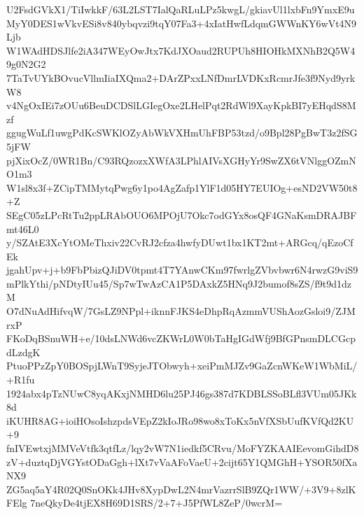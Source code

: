 U2FsdGVkX1/TiIwkkF/63L2LST7IalQaRLuLPz5kwgL/gkiavUl1lxbFn9YmxE9u
MyY0DES1wVkvESi8v840ybqvzi9tqY07Fa3+4xIatHwfLdqmGWWnKY6wVt4N9Ljb
W1WAdHDSJlfe2iA347WEyOwJtx7KdJXOaud2RUPUh8HIOHkMXNhB2Q5W49g0N2G2
7TaTvUYkBOvucVllmIiaIXQma2+DArZPxxLNfDmrLVDKxRcmrJfe3f9Nyd9yrkW8
v4NgOxIEi7zOUu6BeuDCDSlLGIegOxe2LHelPqt2RdWl9XayKpkBI7yEHqdS8Mzf
ggugWuLf1uwgPdKcSWKlOZyAbWkVXHmUhFBP53tzd/o9Bpl28PgBwT3z2fSG5jFW
pjXixOcZ/0WR1Bn/C93RQzozxXWfA3LPhlAIVsXGHyYr9SwZX6tVNlggOZmNO1m3
W1sl8x3f+ZCipTMMytqPwg6y1po4AgZafp1YlF1d05HY7EUIOg+esND2VW50t8+Z
SEgC05zLPcRtTu2ppLRAbOUO6MPOjU7Okc7odGYx8osQF4GNaKsmDRAJBFmt46L0
y/SZAtE3XcYtOMeThxiv22CvRJ2cfza4hwfyDUwt1bx1KT2mt+ARGcq/qEzoCfEk
jgahUpv+j+b9FbPbizQJiDV0tpmt4T7YAnwCKm97fwrlgZVbvbwr6N4rwzG9viS9
mPlkYthi/pNDtyIUu45/Sp7wTwAzCA1P5DAxkZ5HNq9J2bumof8sZS/f9t9d1dzM
O7dNuAdHifvqW/7GsLZ9NPpl+iknnFJKS4eDhpRqAzmmVUShAozGsloi9/ZJMrxP
FKoDqBSnuWH+e/10dsLNWd6vcZKWrL0W0bTaHgIGdWfj9BfGPnsmDLCGcpdLzdgK
PtuoPPzZpY0BOSpjLWnT9SyjeJTObwyh+xeiPmMJZv9GaZcnWKeW1WbMiL/+R1fu
1924abx4pTzNUwC8yqAKxjNMHD6lu25PJ46gs387d7KDBLSSoBLfl3VUm05JKk8d
iKUHR8AG+ioiHOsoIshzpdsVEpZ2kIoJRo98wo8xToKx5nVfXSbUufKVfQd2KU+9
fnIVEwtxjMMVeVtfk3qtfLz/lqy2vW7N1iedkf5CRvu/MoFYZKAAIEevomGihdD8
zV+duztqDjVGYstODaGgh+lXt7vVaAFoVaeU+2cijt65Y1QMGhH+YSOR50fXaNX9
ZG5aq5aY4R02Q0SnOKk4JHv8XypDwL2N4mrVazrrSlB9ZQr1WW/+3V9+8zlKFElg
7neQkyDe4tjEX8H69D1SRS/2+7+J5PfWL8ZeP/0wcrM=
